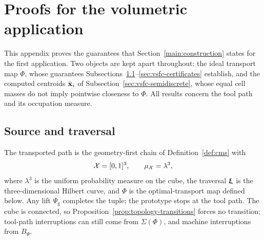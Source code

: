\section{Proofs for the volumetric application}
\label{sec:vsfc}

This appendix proves the guarantees that Section~\ref{main:construction} states for the first application. Two objects are kept apart throughout: the ideal transport map $\Phi$, whose guarantees Subsections~\ref{sec:vsfc-source}--\ref{sec:vsfc-certificates} establish, and the computed centroids $\hat {\bm{\mathrm{x}}}_i$ of Subsection~\ref{sec:vsfc-semidiscrete}, whose equal cell masses do not imply pointwise closeness to $\Phi$. All results concern the tool path and its occupation measure.

\subsection{Source and traversal}
\label{sec:vsfc-source}
\label{sec:vsfc-hilbert}

The transported path is the geometry-first chain of Definition~\ref{def:cms} with
\begin{equation}
  \label{eq:vsfc-components}
  \mathcal{X}=[0,1]^3,\qquad\mu_{\mathcal{X}}=\lambda^3,
\end{equation}
where $\lambda^3$ is the uniform probability measure on the cube, the traversal ${\bm{\mathrm{\upxi}}}$ is the three-dimensional Hilbert curve, and $\Phi$ is the optimal-transport map defined below. Any lift $\Psi_{\mathrm{g}}$ completes the tuple; the prototype stops at the tool path. The cube is connected, so Proposition~\ref{prop:topology-transitions} forces no transition; tool-path interruptions can still come from $\Sigma(\Phi)$, and machine interruptions from $B_\Psi$.

